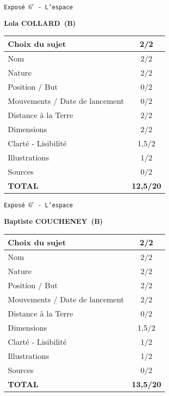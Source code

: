 	\vspace*{1cm}
	
	\newpage
	\LARGE{\texttt{Expos\'e $6^e$ - L'espace}}
	\vspace*{1cm}

	\textbf{Lola COLLARD\ (B)}

	\vspace*{1.5cm}
	\begin{tabular}{|l|c|}
		\hline
		Choix du sujet & 2/2 \\
		\hline
		Nom & 2/2 \\
		\hline
		Nature & 2/2 \\
		\hline
		Position / But & 0/2 \\
		\hline
		Mouvements / Date de lancement & 0/2 \\
		\hline
		Distance \`a la Terre & 2/2 \\
		\hline
		Dimensions & 2/2 \\
		\hline
		Clart\'e - Lisibilit\'e & 1,5/2 \\
		\hline
		Illustrations & 1/2 \\
		\hline
		Sources & 0/2 \\
		\hline
		\textbf{TOTAL}  & \textbf{12,5/20} \\
		\hline
	\end{tabular}

	\vspace*{1cm}
	
	\newpage
	\LARGE{\texttt{Expos\'e $6^e$ - L'espace}}
	\vspace*{1cm}

	\textbf{Baptiste COUCHENEY\ (B)}

	\vspace*{1.5cm}
	\begin{tabular}{|l|c|}
		\hline
		Choix du sujet & 2/2 \\
		\hline
		Nom & 2/2 \\
		\hline
		Nature & 2/2 \\
		\hline
		Position / But & 2/2 \\
		\hline
		Mouvements / Date de lancement & 2/2 \\
		\hline
		Distance \`a la Terre & 0/2 \\
		\hline
		Dimensions & 1,5/2 \\
		\hline
		Clart\'e - Lisibilit\'e & 1/2 \\
		\hline
		Illustrations & 1/2 \\
		\hline
		Sources & 0/2 \\
		\hline
		\textbf{TOTAL}  & \textbf{13,5/20} \\
		\hline
	\end{tabular}

